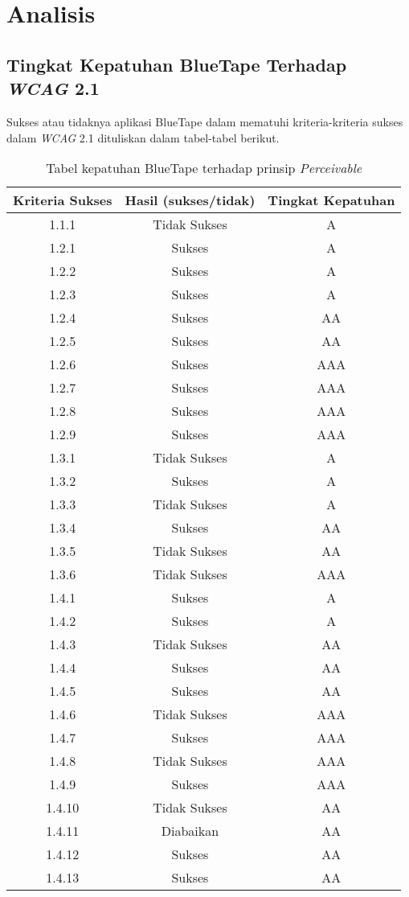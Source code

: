 \chapter{Analisis}
\label{chap:analisis}

\section{Tingkat Kepatuhan BlueTape Terhadap \textit{WCAG} 2.1}
Sukses atau tidaknya aplikasi BlueTape dalam mematuhi kriteria-kriteria sukses dalam \textit{WCAG} 2.1 dituliskan dalam tabel-tabel berikut.
\label{sec:kepatuhan_bluetape_terhadap_wcag_2.1}
\begin{table}[H]
    \centering 
    \caption{Tabel kepatuhan BlueTape terhadap prinsip \textit{Perceivable}}
    \label{tab:kepatuhan_bluetape_perceivable}
    \begin{tabular}{|c|c|c|}
        \toprule
        Kriteria Sukses & Hasil (sukses/tidak) & Tingkat Kepatuhan \\

        \midrule
        1.1.1 & Tidak Sukses & A \\
        1.2.1 & Sukses & A \\
        1.2.2 & Sukses & A \\
        1.2.3 & Sukses & A \\
        1.2.4 & Sukses & AA \\
        1.2.5 & Sukses & AA \\
        1.2.6 & Sukses & AAA \\
        1.2.7 & Sukses & AAA \\
        1.2.8 & Sukses & AAA \\
        1.2.9 & Sukses & AAA \\
        1.3.1 & Tidak Sukses & A \\
        1.3.2 & Sukses & A \\
        1.3.3 & Tidak Sukses & A \\
        1.3.4 & Sukses & AA \\
        1.3.5 & Tidak Sukses & AA \\
        1.3.6 & Tidak Sukses & AAA \\
        1.4.1 & Sukses & A \\
        1.4.2 & Sukses & A \\
        1.4.3 & Tidak Sukses & AA \\
        1.4.4 & Sukses & AA \\
        1.4.5 & Sukses & AA \\
        1.4.6 & Tidak Sukses & AAA \\
        1.4.7 & Sukses & AAA \\
        1.4.8 & Tidak Sukses & AAA \\
        1.4.9 & Sukses & AAA \\
        1.4.10 & Tidak Sukses & AA \\
        1.4.11 & Diabaikan & AA \\
        1.4.12 & Sukses & AA \\
        1.4.13 & Sukses & AA \\
        

\end{tabular}
\end{table}
